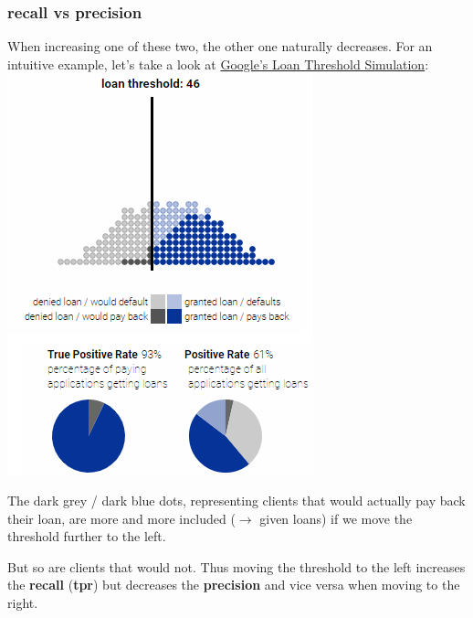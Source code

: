 \documentclass[12pt,a4paper]{article}
\begin{document}
\subsubsection{recall vs precision}
When increasing one of these two, the other one naturally decreases. For an intuitive example, let's take a look at \href{https://research.google.com/bigpicture/attacking-discrimination-in-ml/}{Google's Loan Threshold Simulation}:\\
\includegraphics[scale=0.6]{resources/3/loanML3}\\
\begin{description}
\item The dark grey / dark blue dots, representing clients that would actually pay back their loan, are more and more included ($\rightarrow$ given loans) if we move the threshold further to the left.
\item But so are clients that would not. Thus moving the threshold to the left increases the \textbf{recall} (\textbf{tpr}) but decreases the \textbf{precision} and vice versa when moving to the right.
\end{description}
%
\end{document}
